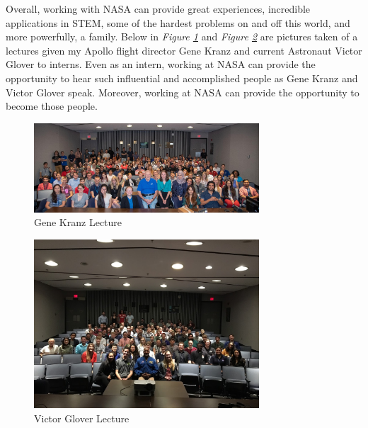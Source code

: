 \documentclass{article}
\begin{document}
Overall, working with NASA can provide great experiences, incredible applications in STEM, some of the hardest problems on and off this world, and more powerfully, a family. Below in \textit{Figure \ref{fig:bigoutreachgroup}} and \textit{Figure \ref{fig:smalleroutreachgroup}} are pictures taken of a lectures given my Apollo flight director Gene Kranz and current Astronaut Victor Glover to interns. Even as an intern, working at NASA can provide the opportunity to hear such influential and accomplished people as Gene Kranz and Victor Glover speak. Moreover, working at NASA can provide the opportunity to become those people.

\begin{figure}[!htb]
  \centering
  \includegraphics[width=0.75\textwidth]{assets/bigoutreachgroup.jpg}
  \caption{Gene Kranz Lecture}
  \label{fig:bigoutreachgroup}
\end{figure}

\begin{figure}[!htb]
  \centering
  \includegraphics[width=0.75\textwidth]{assets/smalleroutreachgroup.png}
  \caption{Victor Glover Lecture}
  \label{fig:smalleroutreachgroup}
\end{figure}
\end{document}

